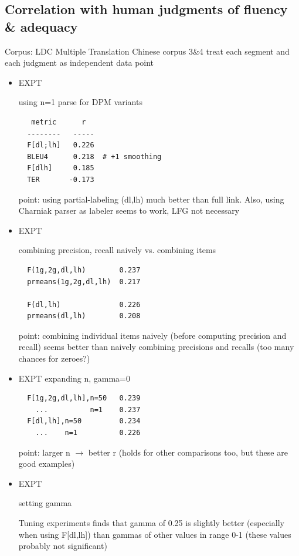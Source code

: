 \documentclass{kluwer}    %
\begin{document}
\begin{article}
\section{Correlation with human judgments of fluency \& adequacy}
\label{sec:faexpts}
Corpus: LDC Multiple Translation Chinese corpus 3\&4 treat each
segment and each judgment as independent data point

\begin{itemize}
\item EXPT

  using n=1 parse for DPM variants

\begin{verbatim}
   metric      r
  --------   -----
  F[dl;lh]   0.226
  BLEU4      0.218  # +1 smoothing
  F[dlh]     0.185
  TER       -0.173
\end{verbatim}

  point: using partial-labeling (dl,lh) much better than full
  link. Also, using Charniak parser as labeler seems to work, LFG not
  necessary

\item EXPT 

  combining precision, recall naively vs. combining items

\begin{verbatim}
  F(1g,2g,dl,lh)        0.237
  prmeans(1g,2g,dl,lh)  0.217

  F(dl,lh)              0.226
  prmeans(dl,lh)        0.208
\end{verbatim}

  point: combining individual items naively (before computing
  precision and recall) seems better than naively combining precisions
  and recalls (too many chances for zeroes?)

\item EXPT
  expanding n, gamma=0

\begin{verbatim}
  F[1g,2g,dl,lh],n=50   0.239
    ...          n=1    0.237
  F[dl,lh],n=50         0.234
    ...    n=1          0.226
\end{verbatim}
  point: larger n $\to$ better r
  (holds for other comparisons too, but these are good examples)

\item  EXPT

  setting gamma

  Tuning experiments finds that gamma of 0.25 is slightly better
  (especially when using F[dl,lh]) than gammas of other values in
  range 0-1 (these values probably not significant)


\end{itemize}
\end{article}
\end{document}
